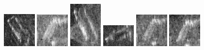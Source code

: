 \begin{figure}
    \includegraphics[width=0.15\textwidth]{chapters/images/dataset/all-class-images/bottle/bottle-181.jpg}
    \includegraphics[width=0.15\textwidth]{chapters/images/dataset/all-class-images/bottle/bottle-23.jpg}
    \includegraphics[width=0.15\textwidth]{chapters/images/dataset/all-class-images/bottle/bottle-385.jpg}
    \includegraphics[width=0.15\textwidth]{chapters/images/dataset/all-class-images/bottle/bottle-120.jpg}
    \includegraphics[width=0.15\textwidth]{chapters/images/dataset/all-class-images/bottle/bottle-12.jpg}
    \includegraphics[width=0.15\textwidth]{chapters/images/dataset/all-class-images/bottle/bottle-5.jpg}
    

\end{figure}
